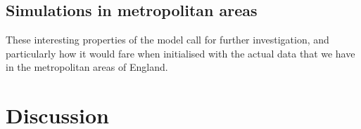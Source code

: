 \documentclass[../thesis.tex]{subfiles}
\begin{document}
\subsection{Simulations in metropolitan areas}
These interesting properties of the model call for further investigation, and
particularly how it would fare when initialised with the actual data that we have in the
metropolitan areas of England.


\section{Discussion}
\end{document}
